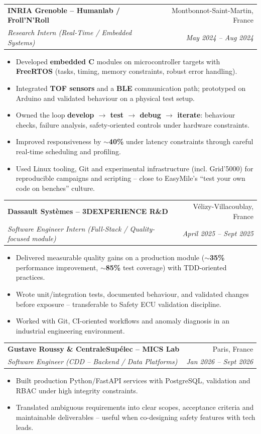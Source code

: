 \documentclass[letterpaper,10.5pt]{article}
\makeatletter
\newcommand{\resumeItem}[1]{\item\small{#1}}
\newcommand{\resumeSubheading}[4]{
  \vspace{3pt}\item
  \begin{tabular*}{0.97\textwidth}[t]{l@{\extracolsep{\fill}}r}
    \textbf{#1} & #2 \\
    \textit{\small #3} & \textit{\small #4} \\
  \end{tabular*}\vspace{1pt}
}
\makeatother
\begin{document}
  \resumeSubheading
    {INRIA Grenoble -- Humanlab / Froll'N'Roll}{Montbonnot-Saint-Martin, France}
    {Research Intern (Real-Time / Embedded Systems)}{May 2024 -- Aug 2024}
    \begin{itemize}
      \resumeItem{Developed \textbf{embedded C} modules on microcontroller targets with \textbf{FreeRTOS} (tasks, timing, memory constraints, robust error handling).}
      \resumeItem{Integrated \textbf{TOF sensors} and a \textbf{BLE} communication path; prototyped on Arduino and validated behaviour on a physical test setup.}
      \resumeItem{Owned the loop \textbf{develop $\rightarrow$ test $\rightarrow$ debug $\rightarrow$ iterate}: behaviour checks, failure analysis, safety-oriented controls under hardware constraints.}
      \resumeItem{Improved responsiveness by \textbf{$\sim$40\%} under latency constraints through careful real-time scheduling and profiling.}
      \resumeItem{Used Linux tooling, Git and experimental infrastructure (incl. Grid'5000) for reproducible campaigns and scripting -- close to EasyMile's ``test your own code on benches'' culture.}
    \end{itemize}

  \resumeSubheading
    {Dassault Syst\`emes -- 3DEXPERIENCE R\&D}{V\'elizy-Villacoublay, France}
    {Software Engineer Intern (Full-Stack / Quality-focused module)}{April 2025 -- Sept 2025}
    \begin{itemize}
      \resumeItem{Delivered measurable quality gains on a production module (\textbf{$\sim$35\%} performance improvement, \textbf{$\sim$85\%} test coverage) with TDD-oriented practices.}
      \resumeItem{Wrote unit/integration tests, documented behaviour, and validated changes before exposure -- transferable to Safety ECU validation discipline.}
      \resumeItem{Worked with Git, CI-oriented workflows and anomaly diagnosis in an industrial engineering environment.}
    \end{itemize}

  \resumeSubheading
    {Gustave Roussy \& CentraleSup\'elec -- MICS Lab}{Paris, France}
    {Software Engineer (CDD -- Backend / Data Platforms)}{Jan 2026 -- Sept 2026}
    \begin{itemize}
      \resumeItem{Built production Python/FastAPI services with PostgreSQL, validation and RBAC under high integrity constraints.}
      \resumeItem{Translated ambiguous requirements into clear scopes, acceptance criteria and maintainable deliverables -- useful when co-designing safety features with tech leads.}
    \end{itemize}
\end{document}
